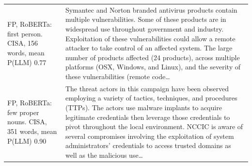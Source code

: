 \begin{table}[t]
\begin{tabular}{p{4.2cm}p{12.8cm}}
FP, RoBERTa: first person. CISA, 156 words, mean P(LLM) 0.77 & Symantec and Norton branded antivirus products contain multiple vulnerabilities. Some of these products are in widespread use throughout government and industry. Exploitation of these vulnerabilities could allow a remote attacker to take control of an affected system. The large number of products affected (24 products), across multiple platforms (OSX, Windows, and Linux), and the severity of these vulnerabilities (remote code\ldots \\
FP, RoBERTa: few proper nouns. CISA, 351 words, mean P(LLM) 0.90 & The threat actors in this campaign have been observed employing a variety of tactics, techniques, and procedures (TTPs). The actors use malware implants to acquire legitimate credentials then leverage those credentials to pivot throughout the local environment. NCCIC is aware of several compromises involving the exploitation of system administrators' credentials to access trusted domains as well as the malicious use\ldots \\
\bottomrule
\end{tabular}
\end{table}
